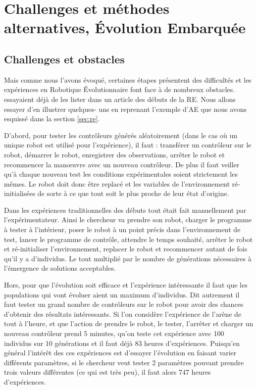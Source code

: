 \section{Challenges et méthodes alternatives, \'Evolution Embarquée}\label{sec:RE:EE}
\subsection{Challenges et obstacles}\label{sec:RE:EE:obs}
Mais comme nous l'avons évoqué, certaines étapes présentent des difficultés et les expériences en Robotique \'Evolutionnaire font face à de nombreux obstacles. \cite{mataric96challengesinevolvingcontrollersforphysicalrobots} essayaient déjà de les lister dans un article des débuts de la RE. Nous allons essayer d'en illustrer quelques- uns en reprenant l'exemple d'AE que nous avons esquissé dans la section \ref{sec:re}.

D'abord, pour tester les contrôleurs générés aléatoirement (dans le cas où un unique robot est utilisé pour l'expérience), il faut : transférer un contrôleur sur le robot, démarrer le robot, enregistrer des observations, arrêter le robot et recommencer la manœuvre avec un nouveau contrôleur. De plus il faut veiller qu'à chaque nouveau test les conditions expérimentales soient strictement les mêmes. Le robot doit donc être replacé et les variables de l'environnement ré-initialisées de sorte à ce que tout soit le plus proche de leur état d'origine.

Dans les expériences traditionnelles des débuts tout était fait manuellement par l'expérimentateur. Ainsi le chercheur va prendre son robot, charger le programme à tester à l'intérieur, poser le robot à un point précis dans l'environnement de test, lancer le programme de contrôle, attendre le temps souhaité, arrêter le robot et ré-initialiser l'environnement, replacer le robot et recommencer autant de fois qu'il y a d'individus. Le tout multiplié par le nombre de générations nécessaires à l'émergence de solutions acceptables.

Hors, pour que l'évolution soit efficace et l'expérience intéressante il faut que les populations qui vont évoluer aient un maximum d'individus. Dit autrement il faut tester un grand nombre de contrôleurs sur le robot pour avoir des chances d'obtenir des résultats intéressants. Si l'on considère l'expérience de l'arène de tout à l'heure, et que l'action de prendre le robot, le tester, l'arrêter et charger un nouveau contrôleur prend 5 minutes, qu'on teste cet expérience avec 100 individus sur 10 générations et il faut déjà 83 heures d'expériences. Puisqu'en général l'intérêt des ces expériences est d'essayer l'évolution en faisant varier différents paramètres, si le chercheur veut tester 2 paramètres pouvant prendre trois valeurs différentes (ce qui est très peu), il faut alors 747 heures d'expériences.

